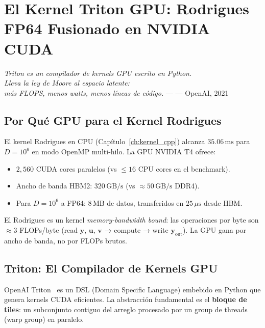 \chapter{El Kernel Triton GPU: Rodrigues FP64 Fusionado en NVIDIA CUDA}


\textit{Triton es un compilador de kernels GPU escrito en Python.\\
Lleva la ley de Moore al espacio latente:\\
más FLOPS, menos watts, menos líneas de código.} --- --- OpenAI, 2021

\section{Por Qué GPU para el Kernel Rodrigues}

El kernel Rodrigues en CPU (Capítulo~\ref{ch:kernel_cpp}) alcanza $35.06\,\text{ms}$
para $D = 10^6$ en modo OpenMP multi-hilo. La GPU NVIDIA T4 ofrece:

\begin{itemize}
\item $2{,}560$ CUDA cores paralelos (vs $\le 16$ CPU cores en el benchmark).
\item Ancho de banda HBM2: $320\,\text{GB/s}$ (vs $\approx 50\,\text{GB/s}$ DDR4).
\item Para $D = 10^6$ a FP64: $8\,\text{MB}$ de datos, transferidos en $25\,\mu\text{s}$ desde HBM.
\end{itemize}

El Rodrigues es un kernel \textit{memory-bandwidth bound}: las operaciones por
byte son $\approx 3$ FLOPs/byte (read $\mathbf{y}$, $\mathbf{u}$, $\mathbf{v}$ → compute → write $\mathbf{y}_\text{out}$).
La GPU gana por ancho de banda, no por FLOPs brutos.

\section{Triton: El Compilador de Kernels GPU}

OpenAI Triton~\cite{tillet2019triton} es un DSL (Domain Specific Language)
embebido en Python que genera kernels CUDA eficientes. La abstracción fundamental
es el \textbf{bloque de tiles}: un subconjunto contiguo del arreglo procesado por
un group de threads (warp group) en paralelo.

